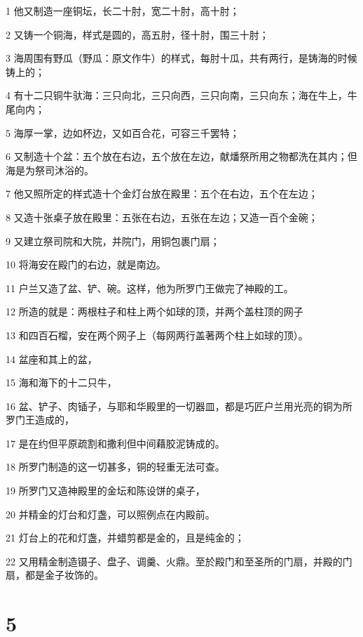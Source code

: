 \par 1 他又制造一座铜坛，长二十肘，宽二十肘，高十肘；
\par 2 又铸一个铜海，样式是圆的，高五肘，径十肘，围三十肘；
\par 3 海周围有野瓜（野瓜：原文作牛）的样式，每肘十瓜，共有两行，是铸海的时候铸上的；
\par 4 有十二只铜牛驮海：三只向北，三只向西，三只向南，三只向东；海在牛上，牛尾向内；
\par 5 海厚一掌，边如杯边，又如百合花，可容三千罢特；
\par 6 又制造十个盆：五个放在右边，五个放在左边，献燔祭所用之物都洗在其内；但海是为祭司沐浴的。
\par 7 他又照所定的样式造十个金灯台放在殿里：五个在右边，五个在左边；
\par 8 又造十张桌子放在殿里：五张在右边，五张在左边；又造一百个金碗；
\par 9 又建立祭司院和大院，并院门，用铜包裹门扇；
\par 10 将海安在殿门的右边，就是南边。
\par 11 户兰又造了盆、铲、碗。这样，他为所罗门王做完了神殿的工。
\par 12 所造的就是：两根柱子和柱上两个如球的顶，并两个盖柱顶的网子
\par 13 和四百石榴，安在两个网子上（每网两行盖著两个柱上如球的顶）。
\par 14 盆座和其上的盆，
\par 15 海和海下的十二只牛，
\par 16 盆、铲子、肉锸子，与耶和华殿里的一切器皿，都是巧匠户兰用光亮的铜为所罗门王造成的，
\par 17 是在约但平原疏割和撒利但中间藉胶泥铸成的。
\par 18 所罗门制造的这一切甚多，铜的轻重无法可查。
\par 19 所罗门又造神殿里的金坛和陈设饼的桌子，
\par 20 并精金的灯台和灯盏，可以照例点在内殿前。
\par 21 灯台上的花和灯盏，并蜡剪都是金的，且是纯金的；
\par 22 又用精金制造镊子、盘子、调羹、火鼎。至於殿门和至圣所的门扇，并殿的门扇，都是金子妆饰的。

\chapter{5}

